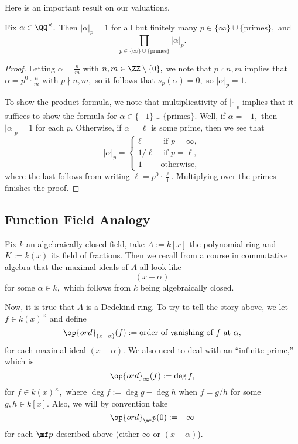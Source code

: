 Here is an important result on our valuations.
\begin{theorem}
	Fix $\alpha\in\QQ^\times.$ Then $|\alpha|_p=1$ for all but finitely many $p\in\{\infty\}\cup\{\text{primes}\},$ and
	\[\prod_{p\in\{\infty\}\cup\{\text{primes}\}}|\alpha|_p.\]
\end{theorem}
\begin{proof}
	Letting $\alpha=\frac nm$ with $n,m\in\ZZ\setminus\{0\},$ we note that $p\nmid n,m$ implies that $\alpha=p^0\cdot\frac nm$ with $p\nmid n,m,$ so it follows that $\nu_p(\alpha)=0,$ so $|\alpha|_p=1.$

	To show the product formula, we note that multiplicativity of $|\cdot|_p$ implies that it suffices to show the formula for $\alpha\in\{-1\}\cup\{\text{primes}\}.$ Well, if $\alpha=-1,$ then $|\alpha|_p=1$ for each $p.$ Otherwise, if $\alpha=\ell$ is some prime, then we see that
	\[|\alpha|_p=\begin{cases}
		\ell & \text{ if }p=\infty, \\
		1/\ell & \text{ if }p=\ell, \\
		1 & \text{otherwise},
	\end{cases}\]
	where the last follows from writing $\ell=p^0\cdot\frac\ell1.$ Multiplying over the primes finishes the proof.
\end{proof}

\subsection{Function Field Analogy}
Fix $k$ an algebraically closed field, take $A:=k[x]$ the polynomial ring and $K:=k(x)$ its field of fractions. Then we recall from a course in commutative algebra that the maximal ideals of $A$ all look like
\[(x-\alpha)\]
for some $\alpha\in k,$ which follows from $k$ being algebraically closed.

Now, it is true that $A$ is a Dedekind ring. To try to tell the story above, we let $f\in k(x)^\times$ and define
\[\op{ord}_{(x-\alpha)}(f):=\text{order of vanishing of }f\text{ at }\alpha,\]
for each maximal ideal $(x-\alpha).$ We also need to deal with an ``infinite prime,'' which is
\[\op{ord}_\infty(f):=\deg f,\]
for $f\in k(x)^\times,$ where $\deg f:=\deg g-\deg h$ when $f=g/h$ for some $g,h\in k[x].$ Also, we will by convention take
\[\op{ord}_\mf p(0):=+\infty\]
for each $\mf p$ described above (either $\infty$ or $(x-\alpha)$).

